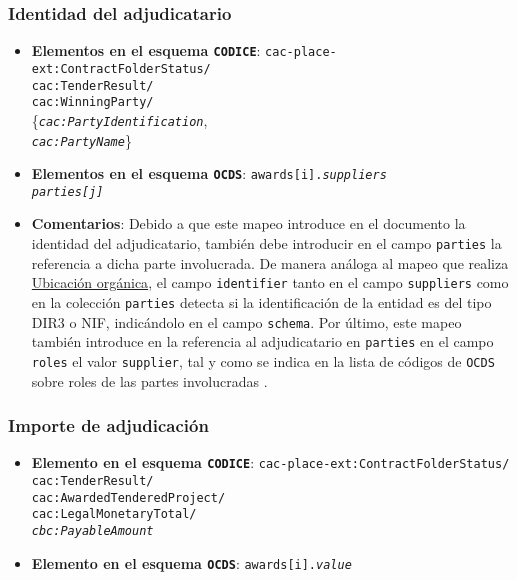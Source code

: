        \subsubsection{Identidad del adjudicatario}
            \begin{itemize}
                \item \textbf{Elementos en el esquema \texttt{CODICE}}:
                    \tabto{7.6cm} \texttt{cac-place-ext:ContractFolderStatus/} \\
                    \tabto{7.6cm} \texttt{cac:TenderResult/} \\
                    \tabto{7.6cm} \texttt{cac:WinningParty/} \\
                    \tabto{7.7cm} \{\texttt{\textit{cac:PartyIdentification}}, \\
                    \tabto{7.7cm} \texttt{\textit{cac:PartyName}}\}
                \item \textbf{Elementos en el esquema \texttt{OCDS}}:
                    \tabto{7.6cm} \texttt{awards[i].\textit{suppliers}} \\
                    \tabto{7.6cm} \texttt{\textit{parties[j]}}
                \item \textbf{Comentarios}: Debido a que este mapeo introduce en el documento la identidad del adjudicatario, también debe introducir en el campo \texttt{parties} la referencia a dicha parte involucrada. De manera análoga al mapeo que realiza  \hyperref[subsec:UbicacionOrganica]{Ubicación orgánica}, el campo \texttt{identifier} tanto en el campo \texttt{suppliers} como en la colección \texttt{parties} detecta si la identificación de la entidad es del tipo DIR3 o NIF, indicándolo en el campo \texttt{schema}. Por último, este mapeo también introduce en la referencia al adjudicatario en \texttt{parties} en el campo \texttt{roles} el valor \texttt{supplier}, tal y como se indica en la lista de códigos de \texttt{OCDS} sobre roles de las partes involucradas \cite{CR18}.
            \end{itemize}
            
        \subsubsection{Importe de adjudicación}
            \begin{itemize}
                \item \textbf{Elemento en el esquema \texttt{CODICE}}:
                    \tabto{7.6cm} \texttt{cac-place-ext:ContractFolderStatus/} \\
                    \tabto{7.6cm} \texttt{cac:TenderResult/} \\
                    \tabto{7.6cm} \texttt{cac:AwardedTenderedProject/} \\
                    \tabto{7.6cm} \texttt{cac:LegalMonetaryTotal/} \\
                    \tabto{7.6cm} \texttt{\textit{cbc:PayableAmount}}
                \item \textbf{Elemento en el esquema \texttt{OCDS}}:
                    \tabto{7.6cm} \texttt{awards[i].\textit{value}}
            \end{itemize}
            
